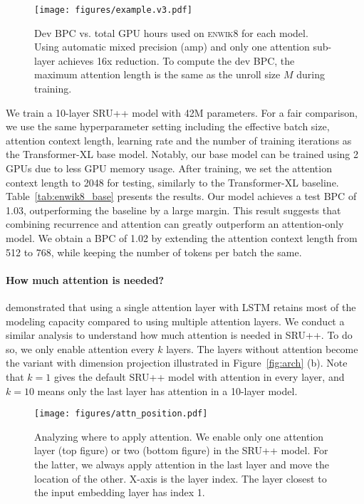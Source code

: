 \begin{figure}[!t!]
\texttt{[image: figures/example.v3.pdf]}
    \caption{Dev BPC vs. total GPU hours used on \textsc{enwik8} for each model. 
Using automatic mixed precision (amp) and only one attention sub-layer achieves 16x reduction.
    To compute the dev BPC, the maximum attention length is the same as the unroll size $M$ during training.}
    \label{fig:enwik8_base}
\end{figure}

We train a 10-layer SRU++ model with 42M parameters. For a fair comparison, we use the same hyperparameter setting including the effective batch size, attention context length, learning rate and the number of training iterations as the Transformer-XL base model.
Notably, our base model can be trained using 2 GPUs due to less GPU memory usage. 
After training, we set the attention context length to 2048 for testing, similarly to the Transformer-XL baseline.
Table~\ref{tab:enwik8_base} presents the results.
Our model achieves a test BPC of 1.03, outperforming the baseline by a large margin.
This result suggests that combining recurrence and attention can greatly outperform an attention-only model.
We obtain a BPC of 1.02 by extending the attention context length from 512 to 768, while keeping the number of tokens per batch the same.

\paragraph{How much attention is needed?}
\citet{merity2019single} demonstrated that using a single attention layer with LSTM retains most of the modeling capacity compared to using multiple attention layers.
We conduct a similar analysis to understand how much attention is needed in SRU++.
To do so, we only enable attention every $k$ layers.
The layers without attention become the variant with dimension projection illustrated in Figure~\ref{fig:arch} (b).
Note that $k=1$ gives the default SRU++ model with attention in every layer, and $k=10$ means only the last layer has attention in a 10-layer model.

\begin{figure}[!t!]
\texttt{[image: figures/attn\_position.pdf]}
\caption{
Analyzing where to apply attention.
We enable only one attention layer (top figure) or two (bottom figure) in the SRU++ model.
For the latter, we always apply attention in the last layer and move the location of the other.
X-axis is the layer index. The layer closest to the input embedding layer has index 1.
}
\label{fig:attn_position}
\end{figure}

